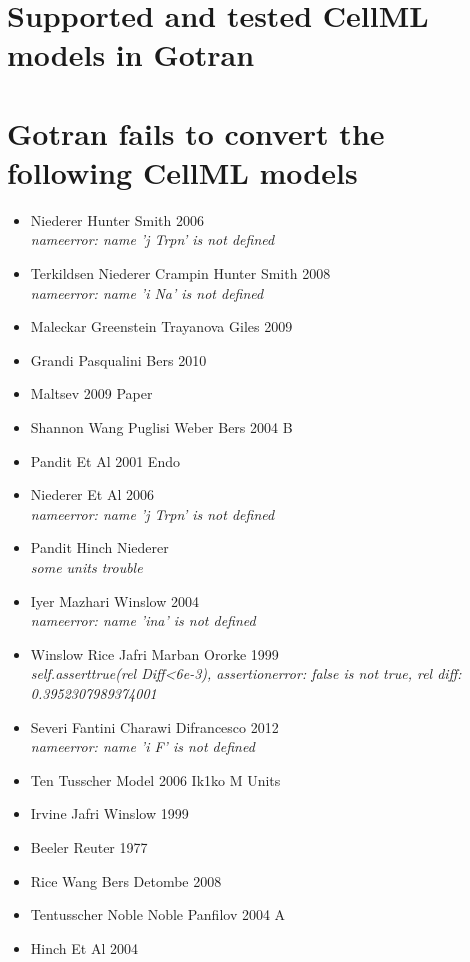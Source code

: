\documentclass[a4paper,12pt]{article}
\begin{document}
\section{Supported and tested CellML models in Gotran}
\begin{itemize}

\end{itemize}
\section{Gotran fails to convert the following CellML models}
\begin{itemize}
\item Niederer Hunter Smith 2006\\{\it nameerror: name 'j Trpn' is not defined}
\item Terkildsen Niederer Crampin Hunter Smith 2008\\{\it nameerror: name 'i Na' is not defined}
\item Maleckar Greenstein Trayanova Giles 2009\\{\it }
\item Grandi Pasqualini Bers 2010\\{\it }
\item Maltsev 2009 Paper\\{\it }
\item Shannon Wang Puglisi Weber Bers 2004 B\\{\it }
\item Pandit Et Al 2001 Endo\\{\it }
\item Niederer Et Al 2006\\{\it nameerror: name 'j Trpn' is not defined}
\item Pandit Hinch Niederer\\{\it some units trouble}
\item Iyer Mazhari Winslow 2004\\{\it nameerror: name 'ina' is not defined}
\item Winslow Rice Jafri Marban Ororke 1999\\{\it self.asserttrue(rel Diff<6e-3), assertionerror: false is not true, rel diff: 0.3952307989374001}
\item Severi Fantini Charawi Difrancesco 2012\\{\it nameerror: name 'i F' is not defined}
\item Ten Tusscher Model 2006 Ik1ko M Units\\{\it }
\item Irvine Jafri Winslow 1999\\{\it }
\item Beeler Reuter 1977\\{\it }
\item Rice Wang Bers Detombe 2008\\{\it }
\item Tentusscher Noble Noble Panfilov 2004 A\\{\it }
\item Hinch Et Al 2004\\{\it }
\end{itemize}
\end{document}
